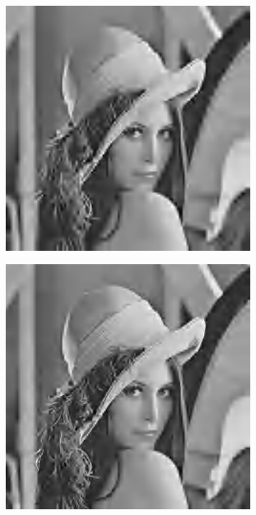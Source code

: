 \documentclass{article}
\begin{document}
\begin{figure}[htbp]
\begin{subfigure}{.19\textwidth}
    \end{subfigure}
    \begin{subfigure}{.19\textwidth}
        \includegraphics[width=\linewidth]{img/jpeg2000/20.jpg}
    \end{subfigure}
    \begin{subfigure}{.19\textwidth}
        \includegraphics[width=\linewidth]{img/jpeg2000/30.jpg}

\end{subfigure}
\end{figure}
\end{document}
